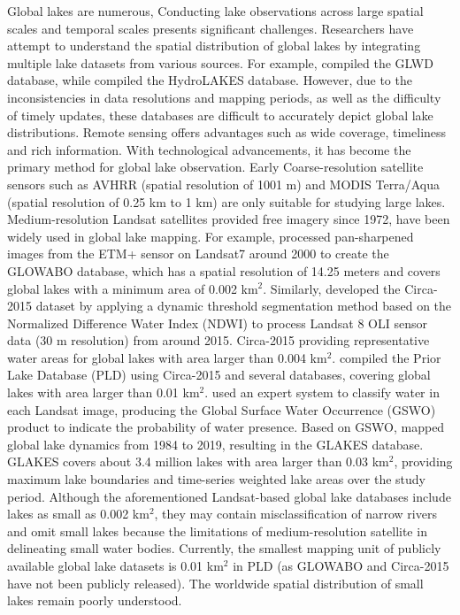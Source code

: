 \documentclass[preprint,12pt,authoryear]{elsarticle}
\begin{document}
Global lakes are numerous, Conducting lake observations across large spatial scales and temporal scales presents significant challenges\citep{sheng_representative_2016}. Researchers have  attempt to understand the spatial distribution of global lakes by integrating multiple lake datasets from various sources. For example, \citet{lehner_development_2004} compiled the GLWD database, while \citet{messager_estimating_2016} compiled the HydroLAKES database. However, due to the inconsistencies in data resolutions and mapping periods, as well as the difficulty of timely updates, these databases are difficult to accurately depict global lake distributions. Remote sensing offers advantages such as wide coverage, timeliness and rich information. With technological advancements, it has become the primary method for global lake observation. Early Coarse-resolution satellite sensors such as AVHRR (spatial resolution of 1001 m) and MODIS Terra/Aqua (spatial resolution of 0.25 km to 1 km) are only suitable for studying large lakes. Medium-resolution Landsat satellites provided free imagery since 1972, have been widely used in global lake mapping. For example, \citet{verpoorter_global_2014} processed pan-sharpened images from the ETM+ sensor on Landsat7 around 2000 to create the GLOWABO database, which has a spatial resolution of 14.25 meters and covers global lakes with a minimum area of 0.002 km$^2$. Similarly, \citet{sheng_representative_2016} developed the Circa-2015 dataset by applying a dynamic threshold segmentation method based on the Normalized Difference Water Index (NDWI) \citep{mcfeeters_use_1996} to process Landsat 8 OLI sensor data (30 m resolution) from around 2015. Circa-2015 providing representative water areas for global lakes with area larger than 0.004 km$^2$. \citet{wang_surface_2025} compiled the Prior Lake Database (PLD) using Circa-2015 and several databases, covering global lakes with area larger than 0.01 km$^2$. \citet{pekel_high-resolution_2016} used an expert system to classify water in each Landsat image, producing the Global Surface Water Occurrence (GSWO) product to indicate the probability of water presence. Based on GSWO, \citet{pi_mapping_2022} mapped global lake dynamics from 1984 to 2019, resulting in the GLAKES database. GLAKES covers about 3.4 million lakes with area larger than 0.03 km$^2$, providing maximum lake boundaries and time-series weighted lake areas over the study period. Although the aforementioned Landsat-based global lake databases include lakes as small as 0.002 km$^2$, they may contain misclassification of narrow rivers and omit small lakes because the limitations of medium-resolution satellite in delineating small water bodies. Currently, the smallest mapping unit of publicly available global lake datasets is 0.01 km$^2$ in PLD (as GLOWABO and Circa-2015 have not been publicly released). The worldwide spatial distribution of small lakes remain poorly understood.
\end{document}
